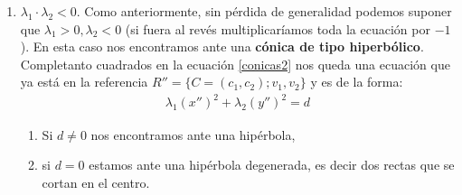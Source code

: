\documentclass[14pt]{book}
\begin{document}
\begin{enumerate}
	\item $\lambda_1 \cdot \lambda_2 < 0$. Como anteriormente, sin pérdida de generalidad podemos suponer que $\lambda_1 > 0, \lambda_2 < 0$ (si fuera al revés multiplicaríamos toda la ecuación por $-1$). En esta caso nos encontramos ante una \textbf{cónica de tipo hiperbólico}. Completanto cuadrados en la ecuación \eqref{conicas2} nos queda una ecuación que ya está en la referencia $R'' = \{C = (c_1, c_2); v_1, v_2\}$ y es de la forma:
	\begin{align*}
		\lambda_1(x'')^2 + \lambda_2(y'')^2 = d
	\end{align*}
	\begin{enumerate}
		\item Si $d ≠ 0$ nos encontramos ante una hipérbola,
		\item si $d = 0$ estamos ante una hipérbola degenerada, es decir dos rectas que se cortan en el centro.
	\end{enumerate}


\end{enumerate}
\end{document}
